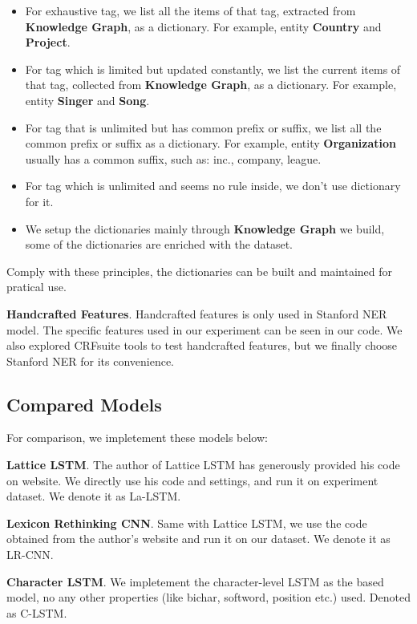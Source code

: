 \documentclass[letterpaper]{article} %
\begin{document}
\begin{itemize}
\item For exhaustive tag, we list all the items of that tag, extracted from \textbf{Knowledge Graph}, as a dictionary. For example, entity \textbf{Country} and \textbf{Project}.
\item For tag which is limited but updated constantly, we list the current items of that tag, collected from \textbf{Knowledge Graph}, as a dictionary. For example, entity \textbf{Singer} and \textbf{Song}.
\item For tag that is unlimited but has common prefix or suffix, we list all the common prefix or suffix as a dictionary. For example, entity \textbf{Organization} usually has a common suffix, such as: inc., company, league.
\item For tag which is unlimited and seems no rule inside, we don't use dictionary for it.
\item We setup the dictionaries mainly through \textbf{Knowledge Graph} we build, some of the dictionaries are enriched with the dataset.
\end{itemize}

Comply with these principles, the dictionaries can be built and maintained for pratical use.

\textbf{Handcrafted Features}. Handcrafted features is only used in Stanford NER model. The specific features used in our experiment can be seen in our code. We also explored CRFsuite tools \cite{CRFsuite} to test handcrafted features, but we finally choose Stanford NER for its convenience.


\subsection{Compared Models}

For comparison, we impletement these models below:

\textbf{Lattice LSTM}. The author of Lattice LSTM \cite{lattice} has generously provided his code on website. We directly use his code and settings, and run it on experiment dataset. We denote it as La-LSTM.

\textbf{Lexicon Rethinking CNN}. Same with Lattice LSTM, we use the code obtained from the author's website \cite{lrcnn} and run it on our dataset. We denote it as LR-CNN.

\textbf{Character LSTM}. We impletement the character-level LSTM as the based model, no any other properties (like bichar, softword, position etc.) used. Denoted as C-LSTM.
\end{document}
